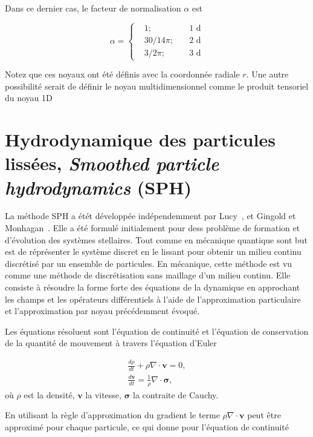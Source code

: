 Dans ce dernier cas, le facteur de normalisation $\alpha$ est

\begin{equation*}
    \alpha = \left\{ \begin{aligned}
         & 1;    \quad      & 1\text{ d} \\
         & 30/14 \pi; \quad & 2\text{ d} \\
         & 3/ 2\pi; \quad   & 3\text{ d}
    \end{aligned}
    \right.
\end{equation*}

Notez que ces noyaux ont été définis avec la coordonnée radiale $r$. Une autre possibilité serait de définir le noyau multidimensionnel comme le produit tensoriel du noyau 1D

\section{Hydrodynamique des particules lissées, \textit{Smoothed particle hydrodynamics} (SPH)}

La méthode SPH a étét développée indépendemment par Lucy~\cite{lucy_1977}, et Gingold et Monhagan~\cite{gingold_monaghan_sph_1977}. Elle a été formulé initialement pour dess problème de formation et d'évolution des systèmes stellaires. Tout comme en mécanique quantique sont but est de réprésenter le système discret en le lissant pour obtenir un milieu continu discrétisé par un ensemble de particules. En mécanique, cette méthode est vu comme une méthode de discrétisation sans maillage d'un milieu continu.
Elle consiste à résoudre la forme forte des équations de la dynamique en approchant les champs et les opérateurs différentiels à l'aide de l'approximation particulaire et l'approximation par noyau précédemment évoqué.

Les équations résoluent sont l'équation de continuité et l'équation de conservation de la quantité de mouvement à travers l'équation d'Euler

\begin{eqnarray*}
    \frac{d\rho}{dt} + \rho \nabla \cdot \bm{v} = 0, \\
    \frac{d\bm v}{dt} = \frac1\rho \nabla \cdot \bm \sigma,
\end{eqnarray*}où $\rho$ est la densité, $\bm v$ la vitesse, $\bm \sigma$ la contraite de Cauchy.

En utilisant la règle d'approximation du gradient le terme $\rho \nabla \cdot \bm{v}$ peut être approximé pour chaque particule, ce qui donne pour l'équation de continuité

